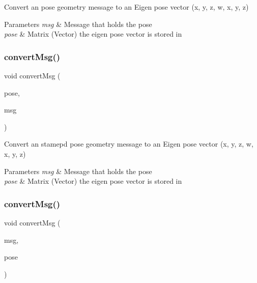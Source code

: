 Convert an pose geometry message to an Eigen pose vector (x, y, z, w, x, y, z) 


\begin{DoxyParams}{Parameters}
{\em msg} & Message that holds the pose \\
\hline
{\em pose} & Matrix (Vector) the eigen pose vector is stored in \\
\hline
\end{DoxyParams}
\mbox{\label{group__multi__robot__controller_ga9e842115a5f448ab0e3ba9fea93d5179}} 
\subsubsection{\texorpdfstring{convert\+Msg()}{convertMsg()}\hspace{0.1cm}{\footnotesize\ttfamily [7/14]}}
{\footnotesize\ttfamily void convert\+Msg (\begin{DoxyParamCaption}\item[{Eigen\+::\+Matrix$<$ double, 7, 1 $>$ \&}]{pose,  }\item[{geometry\+\_\+msgs\+::\+Pose\+Stamped \&}]{msg }\end{DoxyParamCaption})\hspace{0.3cm}{\ttfamily [inline]}}



Convert an stamepd pose geometry message to an Eigen pose vector (x, y, z, w, x, y, z) 


\begin{DoxyParams}{Parameters}
{\em msg} & Message that holds the pose \\
\hline
{\em pose} & Matrix (Vector) the eigen pose vector is stored in \\
\hline
\end{DoxyParams}
\mbox{\label{group__multi__robot__controller_ga7beb50c98e49263d05b3b819be58d76c}} 
\subsubsection{\texorpdfstring{convert\+Msg()}{convertMsg()}\hspace{0.1cm}{\footnotesize\ttfamily [8/14]}}
{\footnotesize\ttfamily void convert\+Msg (\begin{DoxyParamCaption}\item[{geometry\+\_\+msgs\+::\+Pose \&}]{msg,  }\item[{Eigen\+::\+Matrix$<$ double, 7, 1 $>$ \&}]{pose }\end{DoxyParamCaption})\hspace{0.3cm}{\ttfamily [inline]}}



